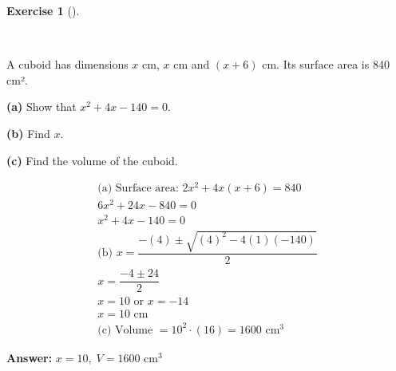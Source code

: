 \documentclass[
  letterpaper,
  DIV=11,
  numbers=noendperiod]{scrreprt}
\theoremstyle{definition}
\newtheorem{exercise}{Exercise}[chapter]
\theoremstyle{remark}
\begin{document}
\begin{exercise}[]\protect\hypertarget{exr-u6-31-2}{}\label{exr-u6-31-2}

~

A cuboid has dimensions \(x\) cm, \(x\) cm and \((x+6)\) cm. Its surface
area is 840 cm².

\textbf{(a)} Show that \(x^2 + 4x - 140 = 0\).

\textbf{(b)} Find \(x\).

\textbf{(c)} Find the volume of the cuboid.

\begin{tcolorbox}[enhanced jigsaw, opacitybacktitle=0.6, coltitle=black, arc=.35mm, colframe=quarto-callout-tip-color-frame, colback=white, bottomrule=.15mm, left=2mm, colbacktitle=quarto-callout-tip-color!10!white, titlerule=0mm, opacityback=0, title=\textcolor{quarto-callout-tip-color}{\faLightbulb}\hspace{0.5em}{🔍 View Solution}, leftrule=.75mm, breakable, rightrule=.15mm, bottomtitle=1mm, toptitle=1mm, toprule=.15mm]

\begin{align*}
\text{(a) Surface area: } 2x^2 + 4x(x+6) = 840 \\ 6x^2 + 24x - 840 = 0 \\ x^2 + 4x - 140 = 0 \\ \text{(b) } x = \dfrac{-(4) \pm \sqrt{(4)^2 - 4(1)(-140)}}{2} \\ x = \dfrac{-4 \pm 24}{2} \\ x = 10 \text{ or } x = -14 \\ x = 10 \text{ cm} \\ \text{(c) Volume } = 10^2 \cdot (16) = 1600 \text{ cm}^3
\end{align*}

\textbf{Answer:} \(x = 10,\; V = 1600 \text{ cm}^3\)

\end{tcolorbox}

\end{exercise}
\end{document}
